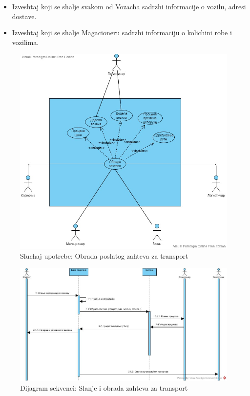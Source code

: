 \begin{enumerate}
\begin{itemize}
                \item Izveshtaj koji se shalje svakom od Vozacha sadrzhi informacije o vozilu, adresi dostave.
                
                \item Izveshtaj koji se shalje Magacioneru sadrzhi informaciju o kolichini robe i vozilima.
                
                
            \end{itemize}
\end{enumerate}

\newpage

\begin{figure}[H]
    \includegraphics[scale=0.5]{Slike/UML/SUobrada.jpg}
    \centering
    \caption{Sluchaj upotrebe: Obrada poslatog zahteva za transport}
    \label{dsuobradazahteva}
\end{figure}    

\begin{figure}[H]
    \includegraphics[width=12cm]{Slike/DFD/slanje i obrada zahteva.jpg}
    \centering
    \caption{Dijagram sekvenci: Slanje i obrada zahteva za transport}
    \label{dsuobradazahteva}
\end{figure}    
